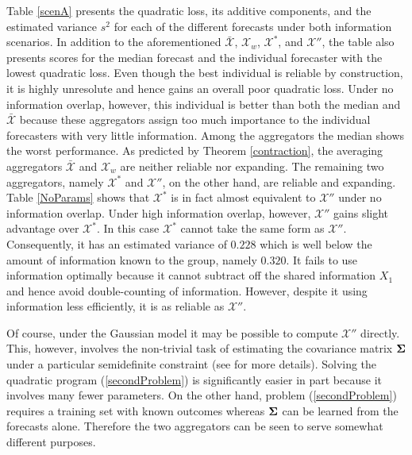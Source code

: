 \documentclass[11pt]{article}
\theoremstyle{definition}
\theoremstyle{definition}
\def\bSigma{{\bf \Sigma}}
\begin{document}
Table \ref{scenA} presents the quadratic loss, its additive components, and the estimated variance $s^2$ for each of the different forecasts under both information scenarios. In addition to the aforementioned $\bar{\mathcal{X}}$, $\mathcal{X}_w$, $\mathcal{X}^*$, and $\mathcal{X}''$, the table also presents scores for the median forecast and the individual forecaster with the lowest quadratic loss. Even though the best individual is reliable by construction, it is highly unresolute and hence gains an overall poor quadratic loss. 
%
 Under no information overlap, however, this individual is better than both the median and $\bar{\mathcal{X}}$ because these aggregators assign too much importance to the individual forecasters with very little information. Among the aggregators the median shows the worst performance.  As predicted by Theorem \ref{contraction},  the averaging aggregators $\bar{\mathcal{X}}$ and $\mathcal{X}_w$ are neither reliable nor expanding. The remaining two aggregators, namely $\mathcal{X}^*$ and $\mathcal{X}''$, on the other hand, are reliable and expanding. Table \ref{NoParams} shows that $\mathcal{X}^*$ is in fact  almost equivalent to $\mathcal{X}''$ under no information overlap. Under high information overlap, however, $\mathcal{X}''$ gains slight advantage over $\mathcal{X}^*$. In this case $\mathcal{X}^*$ cannot take the same form as $\mathcal{X}''$. Consequently, it has an estimated variance of $0.228$ which is well below the  amount of information known to the group, namely $0.320$. It fails to use information optimally because it cannot subtract off the shared information $X_1$ and hence avoid double-counting of information. However, despite it using information less efficiently, it is as reliable as $\mathcal{X}''$. 

Of course, under the Gaussian model it may be possible to compute $\mathcal{X}''$ directly. This, however, involves the non-trivial task of estimating the covariance matrix $\bSigma$ under a particular semidefinite constraint (see \citealt{satopaamodeling2} for more details). Solving the quadratic program (\ref{secondProblem}) is significantly easier in part because it involves many fewer parameters. On the other hand, problem (\ref{secondProblem}) requires a training set with known outcomes whereas $\bSigma$ can be learned from the forecasts alone. Therefore the two aggregators can be seen to serve somewhat different purposes. 
\end{document}
